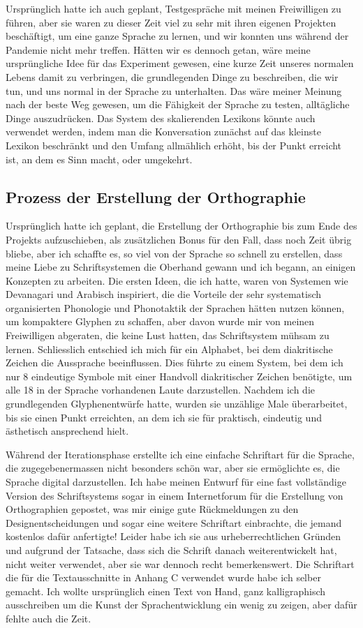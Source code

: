 \documentclass{article}
\begin{document}
Ursprünglich hatte ich auch geplant, Testgespräche mit meinen Freiwilligen zu führen,
aber sie waren zu dieser Zeit viel zu sehr mit ihren eigenen Projekten beschäftigt, um eine ganze Sprache zu lernen,
und wir konnten uns während der Pandemie nicht mehr treffen. Hätten wir es dennoch getan, wäre meine ursprüngliche
Idee für das Experiment gewesen, eine kurze Zeit unseres normalen Lebens damit zu verbringen,
die grundlegenden Dinge zu beschreiben, die wir tun, und uns normal in der Sprache zu unterhalten.
Das wäre meiner Meinung nach der beste Weg gewesen, um die Fähigkeit der Sprache zu testen, alltägliche Dinge auszudrücken.
Das System des skalierenden Lexikons könnte auch verwendet werden, indem man die Konversation zunächst auf das kleinste
Lexikon beschränkt und den Umfang allmählich erhöht, bis der Punkt erreicht ist, an dem es Sinn macht, oder umgekehrt.

\subsection{Prozess der Erstellung der Orthographie}
Ursprünglich hatte ich geplant, die Erstellung der Orthographie bis zum Ende des Projekts aufzuschieben,
als zusätzlichen Bonus für den Fall, dass noch Zeit übrig bliebe, aber ich schaffte es,
so viel von der Sprache so schnell zu erstellen, dass meine Liebe zu Schriftsystemen die Oberhand gewann und ich begann,
an einigen Konzepten zu arbeiten. Die ersten Ideen, die ich hatte, waren von Systemen wie Devanagari und Arabisch inspiriert,
die die Vorteile der sehr systematisch organisierten Phonologie und Phonotaktik der Sprachen hätten nutzen können,
um kompaktere Glyphen zu schaffen, aber davon wurde mir von meinen Freiwilligen abgeraten, die keine Lust hatten,
das Schriftsystem mühsam zu lernen. Schliesslich entschied ich mich für ein Alphabet, bei dem diakritische Zeichen
die Aussprache beeinflussen. Dies führte zu einem System, bei dem ich nur 8 eindeutige Symbole mit einer Handvoll
diakritischer Zeichen benötigte, um alle 18 in der Sprache vorhandenen Laute darzustellen. Nachdem ich die grundlegenden
Glyphenentwürfe hatte, wurden sie unzählige Male überarbeitet, bis sie einen Punkt erreichten, an dem ich sie für praktisch,
eindeutig und ästhetisch ansprechend hielt.

Während der Iterationsphase erstellte ich eine einfache Schriftart für die Sprache,
die zugegebenermassen nicht besonders schön war, aber sie ermöglichte es, die Sprache digital darzustellen.
Ich habe meinen Entwurf für eine fast vollständige Version des Schriftsystems sogar in einem Internetforum
für die Erstellung von Orthographien gepostet, was mir einige gute Rückmeldungen zu den Designentscheidungen
und sogar eine weitere Schriftart einbrachte, die jemand kostenlos dafür anfertigte! Leider habe ich sie aus
urheberrechtlichen Gründen und aufgrund der Tatsache, dass sich die Schrift danach weiterentwickelt hat,
nicht weiter verwendet, aber sie war dennoch recht bemerkenswert. Die Schriftart die für die Textausschnitte
in Anhang C verwendet wurde habe ich selber gemacht. Ich wollte ursprünglich einen Text von Hand, ganz
kalligraphisch ausschreiben um die Kunst der Sprachentwicklung ein wenig zu zeigen, aber dafür fehlte auch die Zeit.
\end{document}
